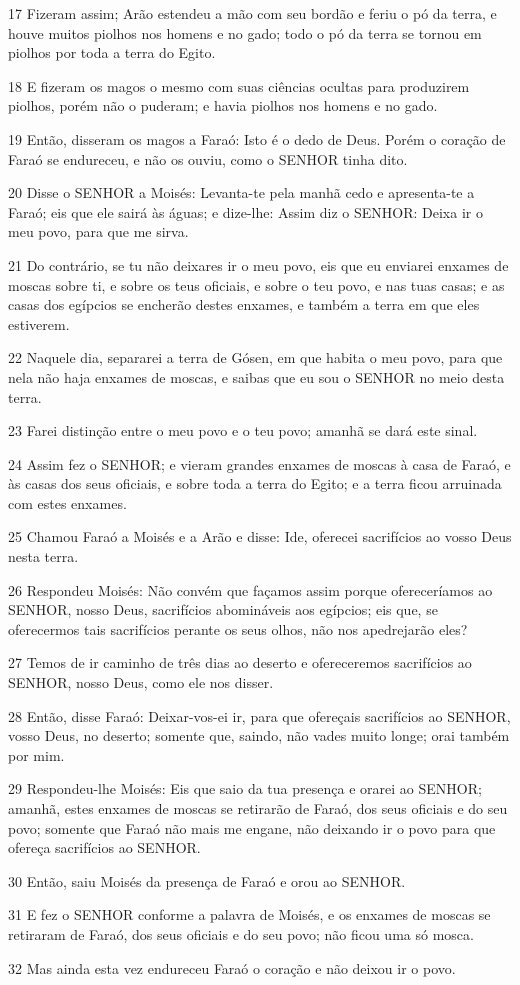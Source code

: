 \par 17 Fizeram assim; Arão estendeu a mão com seu bordão e feriu o pó da terra, e houve muitos piolhos nos homens e no gado; todo o pó da terra se tornou em piolhos por toda a terra do Egito.
\par 18 E fizeram os magos o mesmo com suas ciências ocultas para produzirem piolhos, porém não o puderam; e havia piolhos nos homens e no gado.
\par 19 Então, disseram os magos a Faraó: Isto é o dedo de Deus. Porém o coração de Faraó se endureceu, e não os ouviu, como o SENHOR tinha dito.
\par 20 Disse o SENHOR a Moisés: Levanta-te pela manhã cedo e apresenta-te a Faraó; eis que ele sairá às águas; e dize-lhe: Assim diz o SENHOR: Deixa ir o meu povo, para que me sirva.
\par 21 Do contrário, se tu não deixares ir o meu povo, eis que eu enviarei enxames de moscas sobre ti, e sobre os teus oficiais, e sobre o teu povo, e nas tuas casas; e as casas dos egípcios se encherão destes enxames, e também a terra em que eles estiverem.
\par 22 Naquele dia, separarei a terra de Gósen, em que habita o meu povo, para que nela não haja enxames de moscas, e saibas que eu sou o SENHOR no meio desta terra.
\par 23 Farei distinção entre o meu povo e o teu povo; amanhã se dará este sinal.
\par 24 Assim fez o SENHOR; e vieram grandes enxames de moscas à casa de Faraó, e às casas dos seus oficiais, e sobre toda a terra do Egito; e a terra ficou arruinada com estes enxames.
\par 25 Chamou Faraó a Moisés e a Arão e disse: Ide, oferecei sacrifícios ao vosso Deus nesta terra.
\par 26 Respondeu Moisés: Não convém que façamos assim porque ofereceríamos ao SENHOR, nosso Deus, sacrifícios abomináveis aos egípcios; eis que, se oferecermos tais sacrifícios perante os seus olhos, não nos apedrejarão eles?
\par 27 Temos de ir caminho de três dias ao deserto e ofereceremos sacrifícios ao SENHOR, nosso Deus, como ele nos disser.
\par 28 Então, disse Faraó: Deixar-vos-ei ir, para que ofereçais sacrifícios ao SENHOR, vosso Deus, no deserto; somente que, saindo, não vades muito longe; orai também por mim.
\par 29 Respondeu-lhe Moisés: Eis que saio da tua presença e orarei ao SENHOR; amanhã, estes enxames de moscas se retirarão de Faraó, dos seus oficiais e do seu povo; somente que Faraó não mais me engane, não deixando ir o povo para que ofereça sacrifícios ao SENHOR.
\par 30 Então, saiu Moisés da presença de Faraó e orou ao SENHOR.
\par 31 E fez o SENHOR conforme a palavra de Moisés, e os enxames de moscas se retiraram de Faraó, dos seus oficiais e do seu povo; não ficou uma só mosca.
\par 32 Mas ainda esta vez endureceu Faraó o coração e não deixou ir o povo.

